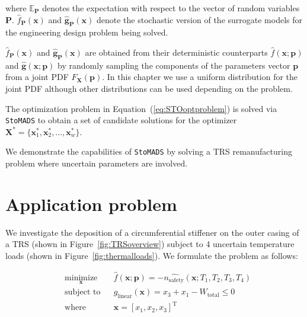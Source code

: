 where $\mathbb{E}_{\mathbf{P}}$ denotes the expectation with respect to the vector of random variables $\mathbf{P}$. $\hat{f}_{\mathbf{P}}(\mathbf{x})$ and $\hat{\mathbf{g}}_{\mathbf{P}}(\mathbf{x})$ denote the stochastic version of the surrogate models for the engineering design problem being solved.

$\hat{f}_{\mathbf{P}}(\mathbf{x})$ and $\hat{\mathbf{g}}_{\mathbf{P}}(\mathbf{x})$ are obtained from their deterministic counterparts $\hat{f}(\mathbf{x};{\mathbf{p}})$ and $\hat{\mathbf{g}}(\mathbf{x};{\mathbf{p}})$ by randomly sampling the components of the parameters vector $\mathbf{p}$ from a joint \ac{PDF} $F_{\mathbf{X}}(\mathbf{p})$. In this chapter we use a uniform distribution for the joint \ac{PDF} although other distributions can be used depending on the problem.

The optimization problem in Equation~(\ref{eq:STOoptproblem}) is solved via \texttt{StoMADS} to obtain a set of candidate solutions for the optimizer $\mathbf{X}^*=  \{ \mathbf{x}^*_1,\mathbf{x}^*_2,\ldots,\mathbf{x}^*_w \} $.

We demonstrate the capabilities of \texttt{StoMADS} by solving a \ac{TRS} remanufacturing problem where uncertain parameters are involved.

\section{Application problem} \label{sec:STOcasestudy}

We investigate the deposition of a circumferential stiffener on the outer casing of a \ac{TRS} (shown in Figure~\ref{fig:TRSoverview}) subject to 4 uncertain temperature loads (shown in Figure~\ref{fig:thermalloads}). We formulate the problem as follows:

\begin{equation} \label{eq:Stoproblemdet}
    \begin{aligned}
        & \underset{\mathbf{x}}{\text{minimize}}
        & & \hat{f}(\mathbf{x};\mathbf{p}) = -\hat{n_{\textrm{safety}}}(\mathbf{x};T_1,T_2,T_3,T_4)\\
        & \text{subject to}
        & & {g_{\textrm{linear}}}(\mathbf{x}) = x_3 + x_1 - W_{\textrm{total}} \le 0\\
        & \text{where}
        & & \mathbf{x} = \left[x_1,x_2,x_3\right]^{\mathrm{T}}\\
    \end{aligned}
\end{equation}

